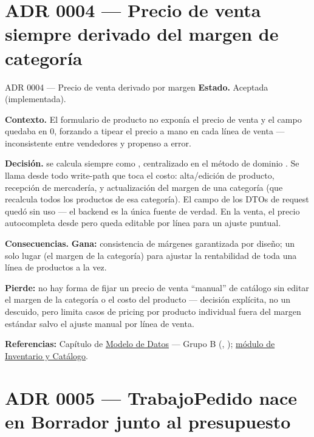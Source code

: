 \section{ADR 0004 --- Precio de venta siempre derivado del margen de categoría}
\label{adr:0004}

\begin{cajaADR}{ADR 0004 --- Precio de venta derivado por margen}
\textbf{Estado.} Aceptada (implementada).

\textbf{Contexto.} El formulario de producto no exponía el precio de venta y el campo quedaba en 0, forzando a tipear el precio a mano en cada línea de venta --- inconsistente entre vendedores y propenso a error.

\textbf{Decisión.} \allowbreak {} se calcula siempre como , centralizado en el método de dominio . Se llama desde todo write-path que toca el costo: alta/edición de producto, recepción de mercadería, y actualización del margen de una categoría (que recalcula todos los productos de esa categoría). El campo  de los DTOs de request quedó sin uso --- el backend es la única fuente de verdad. En la venta, el precio autocompleta desde \allowbreak {} pero queda editable por línea para un ajuste puntual.

\textbf{Consecuencias.} \textbf{Gana:} consistencia de márgenes garantizada por diseño; un solo lugar (el margen de la categoría) para ajustar la rentabilidad de toda una línea de productos a la vez.

\textbf{Pierde:} no hay forma de fijar un precio de venta ``manual'' de catálogo sin editar el margen de la categoría o el costo del producto --- decisión explícita, no un descuido, pero limita casos de pricing por producto individual fuera del margen estándar salvo el ajuste manual por línea de venta.
\end{cajaADR}

\textbf{Referencias:} Capítulo de \hyperref[sec:modelo-datos]{Modelo de Datos} --- Grupo B (, ); \hyperref[mod:07-inventario-catalogo]{módulo de Inventario y Catálogo}.

\section{ADR 0005 --- TrabajoPedido nace en Borrador junto al presupuesto}
\label{adr:0005}

